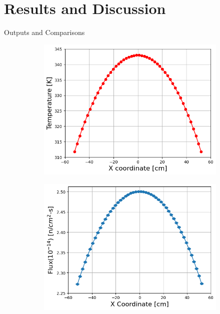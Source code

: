 \documentclass[9pt,t]{beamer}
\begin{document}
\section{Results and Discussion}
\begin{frame}{Outputs and Comparisons}
    \begin{figure}[T]
        \hspace*{-1cm}
        \begin{subfigure}[b]{0.495\linewidth}
            \centering
            \includegraphics[height=0.85\linewidth]{figures/temp_50.png}
        \end{subfigure}\hspace*{0.6cm}
        \begin{subfigure}[b]{0.495\linewidth}
        \centering
            \includegraphics[height=0.85\linewidth]{figures/flux_50.png}

\end{subfigure}
\end{figure}
\end{frame}
\end{document}
